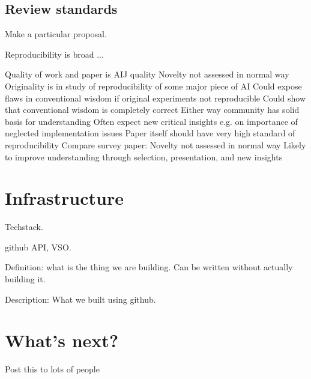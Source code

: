 \documentclass{article}
\begin{document}
\subsection{ Review standards }

Make a particular proposal. 

Reproducibility is broad ... 


Quality of work and paper is AIJ quality
Novelty not assessed in normal way
Originality is in study of reproducibility of some major piece of AI
Could expose flaws in conventional wisdom if original experiments not reproducible
Could show that conventional wisdom is completely correct 
Either way community has solid basis for understanding 
Often expect new critical insights e.g. on importance of neglected implementation issues
Paper itself should have very high standard of reproducibility
Compare survey paper:
Novelty not assessed in normal way
Likely to improve understanding through selection, presentation, and new insights



\section{Infrastructure}

Techstack. 

github API, VSO. 


Definition: what is the thing we are building. Can be written without actually building it. 

Description: What we built using github. 


\section{What's next?}

Post this to lots of people




%
\end{document}
